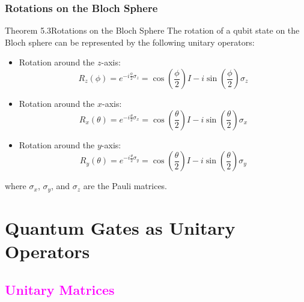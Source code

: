 \documentclass{book}
\begin{document}
\subsection{Rotations on the Bloch Sphere}
\begin{thmBox}{Theorem 5.3}{Rotations on the Bloch Sphere}
    The rotation of a qubit state on the Bloch sphere can be represented by the following unitary operators:
    \begin{itemize}
        \item Rotation around the $z$-axis:
        \[
            R_z(\phi) = e^{-i\frac{\phi}{2}\sigma_z} = \cos\left(\frac{\phi}{2}\right)I - i\sin\left(\frac{\phi}{2}\right)\sigma_z
        \]
        \item Rotation around the $x$-axis:
        \[
            R_x(\theta) = e^{-i\frac{\theta}{2}\sigma_x} = \cos\left(\frac{\theta}{2}\right)I - i\sin\left(\frac{\theta}{2}\right)\sigma_x
        \]
        \item Rotation around the $y$-axis:
        \[
            R_y(\theta) = e^{-i\frac{\theta}{2}\sigma_y} = \cos\left(\frac{\theta}{2}\right)I - i\sin\left(\frac{\theta}{2}\right)\sigma_y
        \]
    \end{itemize}
    where $\sigma_x$, $\sigma_y$, and $\sigma_z$ are the Pauli matrices.
\end{thmBox}




\chapter{Quantum Gates as Unitary Operators}

\textcolor{magenta}{\section{\textbf{Unitary Matrices}}}
\end{document}
